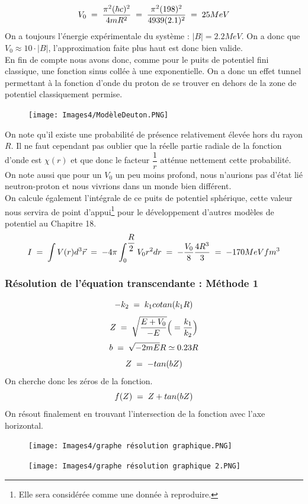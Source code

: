\begin{equation*}
    V_0 \; = \; \dfrac{\pi^2(\hbar c)^2}{4mR^2} \; = \; \dfrac{\pi^2 (198)^2}{4 939 (2.1)^2}
    \; = \; 25MeV
\end{equation*}
On a toujours l'énergie expérimentale du système : $|B| = 2.2MeV$. On a donc que $V_0 \approx 10\cdot|B|$, l'approximation faite plus haut est donc bien valide.\\
En fin de compte nous avons donc, comme pour le puits de potentiel fini classique, une fonction sinus collée à une exponentielle. On a donc un effet tunnel permettant à la fonction d'onde du proton de se trouver en dehors de la zone de potentiel classiquement permise.
\begin{figure}[H]
    \centering
    \texttt{[image: Images4/ModèleDeuton.PNG]}
\end{figure}
On note qu'il existe une probabilité de présence relativement élevée hors du rayon $R$. Il ne faut cependant pas oublier que la réelle partie radiale de la fonction d'onde est $\chi(r)$ et que donc le facteur $\dfrac{1}{r}$ atténue nettement cette probabilité.\\
On note aussi que pour un $V_0$ un peu moins profond, nous n'aurions pas d'état lié neutron-proton et nous vivrions dans un monde bien différent.\\

On calcule également l'intégrale de ce puits de potentiel sphérique, cette valeur nous servira de point d'appui\footnote{Elle sera considérée comme une donnée à reproduire.} pour le développement d'autres modèles de potentiel au Chapitre 18.
\begin{equation*}
    I 
    \; = \; \int V(r) d^3\vec{r} 
    \; = \; -4\pi\int_0^{\dfrac{R}{2}} V_0 r^2 dr 
    \; = \; -\dfrac{V_0}{8}\dfrac{4R^3}{3}
    \; = \; -170MeVfm^3
\end{equation*}
\subsubsection{Résolution de l'équation transcendante : Méthode 1}
\begin{equation*}
    -k_2 \; = \; k_1 cotan(k_1R)
\end{equation*}
\begin{equation*}
    Z \; = \; \sqrt{\dfrac{E+V_0}{-E}} \Big(= \dfrac{k_1}{k_2} \Big)
\end{equation*}
\begin{equation*}
    b \; = \; \sqrt{-2mE}R \simeq 0.23 R
\end{equation*}
\begin{equation*}
    Z \; = \; -tan(bZ)
\end{equation*}
On cherche donc les zéros de la fonction. 
\begin{equation*}
    f(Z) \; = \; Z + tan(bZ)
\end{equation*}
On résout finalement en trouvant l'intersection de la fonction avec l'axe horizontal.
\begin{figure}[H]
    \centering
    \texttt{[image: Images4/graphe résolution graphique.PNG]}
\end{figure}
\begin{figure}[H]
    \centering
    \texttt{[image: Images4/graphe résolution graphique 2.PNG]}
\end{figure}
